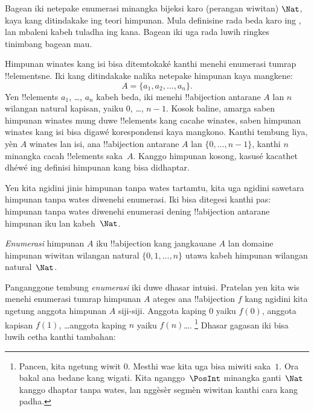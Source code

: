 \documentclass[../../../include/open-logic-section]{subfiles}
\begin{document}


\begin{editorial}
  Bagean iki netepake enumerasi minangka bijeksi karo (perangan wiwitan)
  $\Nat$, kaya kang ditindakake ing teori himpunan. Mula definisine
  rada beda karo ing , lan mbaleni kabeh
  tuladha ing kana. Bagean iki uga rada luwih ringkes tinimbang
  bagean mau.
\end{editorial}

Himpunan winates kang isi bisa ditemtokaké kanthi menehi enumerasi tumrap
!!{element}sne. Iki kang ditindakake nalika netepake himpunan kaya mangkene:
\[
  A = \{a_1, a_2, \ldots, a_n\}.
\]
Yen !!{element}s $a_1$, \dots, $a_n$ kabeh beda,
iki menehi !!a{bijection} antarane $A$ lan $n$ wilangan natural
kapisan, yaiku $0$, \dots, $n-1$. Kosok baline, amarga saben
himpunan winates mung duwe !!{element}s kang cacahe winates,
saben himpunan winates kang isi bisa digawé korespondensi kaya mangkono.
Kanthi tembung liya, yèn $A$ winates lan isi, ana
!!a{bijection} antarane $A$ lan $\{0, \dots, n-1\}$,
kanthi $n$ minangka cacah !!{element}s saka~$A$.
Kanggo himpunan kosong, kasusé kacathet dhéwé ing definisi himpunan kang bisa didhaptar.

Yen kita ngidini jinis himpunan tanpa wates tartamtu, kita uga
ngidini sawetara himpunan tanpa wates diwenehi enumerasi.
Iki bisa ditegesi kanthi pas: himpunan tanpa wates diwenehi enumerasi
dening !!a{bijection} antarane himpunan iku lan kabeh~$\Nat$.

\begin{defn}
\emph{Enumerasi} himpunan $A$ iku !!a{bijection} kang jangkauane
$A$ lan domaine himpunan wiwitan wilangan natural $\{0,
1, \ldots, n\}$ {utawa} kabeh himpunan wilangan natural~$\Nat$.
\end{defn}

\begin{explain}
Panganggone tembung \emph{enumerasi} iki duwe dhasar intuisi.
Pratelan yen kita wis menehi enumerasi tumrap himpunan $A$ ateges
ana !!a{bijection} $f$ kang ngidini kita ngetung anggota
himpunan $A$ siji-siji. Anggota kaping $0$ yaiku $f(0)$,
anggota kapisan $f(1)$, \ldots anggota kaping $n$ yaiku $f(n)$\ldots.
\footnote{Pancen, kita ngetung wiwit $0$. Mesthi wae kita uga
bisa miwiti saka~$1$. Ora bakal ana bedane kang wigati.
Kita nganggo~$\PosInt$ minangka ganti~$\Nat$ kanggo dhaptar tanpa wates, lan nggèsèr segmèn wiwitan kanthi cara kang padha.}
Dhasar gagasan iki bisa luwih cetha kanthi tambahan:
\end{explain}
\end{document}
